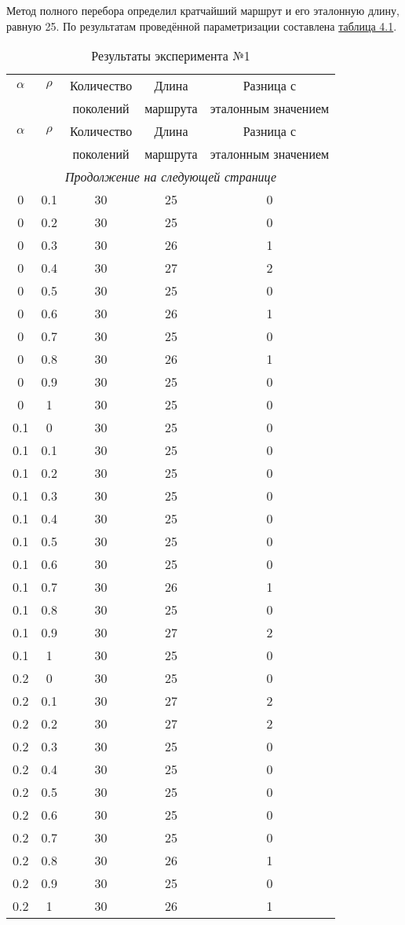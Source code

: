 Метод полного перебора определил кратчайший маршрут и его эталонную длину, равную 25. По результатам проведённой параметризации составлена \hyperref[table_1]{таблица 4.1}.


\begin{longtable}{|c|c|c|c|c|}
	\caption{Результаты эксперимента №1}\label{table_1}\\
	\hline
	
	$\alpha$ & $\rho$ & Количество  & Длина & Разница с  \\
	&& поколений & маршрута & эталонным значением\\
	\hline
	\endfirsthead
	
	\hline
	$\alpha$ & $\rho$ & Количество  & Длина & Разница с  \\
	&& поколений & маршрута & эталонным значением\\
	\hline
	\endhead
	
	\hline
	\multicolumn{5}{c}{\textit{Продолжение на следующей странице}}
	\endfoot
	\hline
	\endlastfoot
	
	0& 0& 30& 26& 1\\
	0& 0.1& 30& 25& 0\\
	0& 0.2& 30& 25& 0\\
	0& 0.3& 30& 26& 1\\
	0& 0.4& 30& 27& 2\\
	0& 0.5& 30& 25& 0\\
	0& 0.6& 30& 26& 1\\
	0& 0.7& 30& 25& 0\\
	0& 0.8& 30& 26& 1\\
	0& 0.9& 30& 25& 0\\
	0& 1& 30& 25& 0 \\
	\hline
	
	0.1& 0& 30& 25& 0\\
	0.1& 0.1& 30& 25& 0\\
	0.1& 0.2& 30& 25& 0\\
	0.1& 0.3& 30& 25& 0\\
	0.1& 0.4& 30& 25& 0\\
	0.1& 0.5& 30& 25& 0\\
	0.1& 0.6& 30& 25& 0\\
	0.1& 0.7& 30& 26& 1\\
	0.1& 0.8& 30& 25& 0\\
	0.1& 0.9& 30& 27& 2\\
	0.1& 1& 30& 25& 0\\
	\hline
	
	0.2& 0& 30& 25& 0\\
	0.2& 0.1& 30& 27& 2\\
	0.2& 0.2& 30& 27& 2\\
	0.2& 0.3& 30& 25& 0\\
	0.2& 0.4& 30& 25& 0\\
	0.2& 0.5& 30& 25& 0\\
	0.2& 0.6& 30& 25& 0\\
	0.2& 0.7& 30& 25& 0\\
	0.2& 0.8& 30& 26& 1\\
	0.2& 0.9& 30& 25& 0\\
	0.2& 1& 30& 26& 1\\
	\hline
	

\end{longtable}
